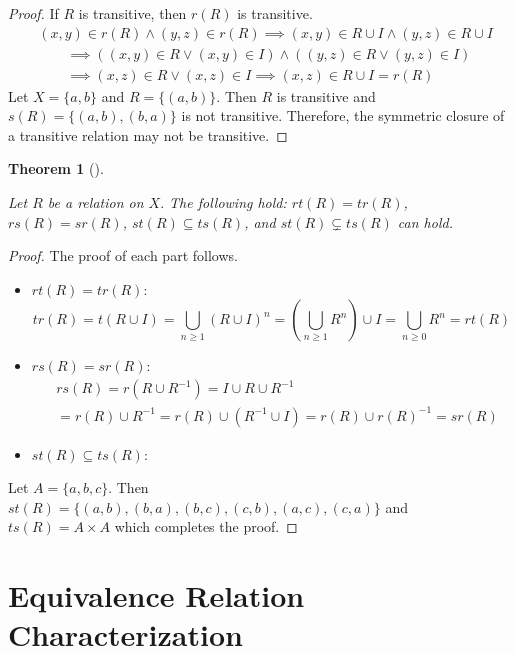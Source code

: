 \documentclass[
  letterpaper,
  10pt,
  reqno,
  twopage,
  openany]{book}
\theoremstyle{plain}
\theoremstyle{definition}
\theoremstyle{definition}
\theoremstyle{definition}
\theoremstyle{plain}
\theoremstyle{plain}
\newtheorem{theorem}{Theorem}[chapter]
\theoremstyle{remark}
\begin{document}
\begin{proof}

If \(R\) is transitive, then \(r(R)\) is transitive. \begin{align*}
& (x,y)\in r(R) \land (y,z)\in r(R)
\implies (x,y)\in R\cup I \land (y,z)\in R\cup I 
\\ & \qquad 
\implies ((x,y)\in R \lor (x,y)\in I)\land ((y,z)\in R \lor (y,z)\in I)
\\ & \qquad 
\implies (x,z)\in R \lor (x,z)\in I
\implies (x,z)\in R \cup I =r(R)
\end{align*} Let \(X=\{a,b\}\) and \(R=\{(a,b)\}.\) Then \(R\) is
transitive and \(s(R)=\{(a,b),(b,a)\}\) is not transitive. Therefore,
the symmetric closure of a transitive relation may not be transitive.

\end{proof}

\leavevmode{}%
\begin{theorem}[]\label{thm-rts}

Let \(R\) be a relation on \(X.\) The following hold: \(rt(R)=tr(R)\),
\(rs(R)=sr(R)\), \(st(R)\subseteq ts(R)\), and \(st(R)\subsetneq ts(R)\)
can hold.

\end{theorem}

\begin{proof}

The proof of each part follows.

\begin{itemize}
\item
  \(rt(R)=tr(R)\): \[ 
  tr(R)
  =t(R\cup I)=\bigcup_{n\geq 1} (R\cup I)^n
  =\left(\bigcup_{n\geq 1}R^n \right) \cup I 
  =\bigcup_{n\geq 0} R^n =rt(R)
  \]
\item
  \(rs(R)=sr(R)\): \begin{align*}
  & rs(R) = r(R\cup R^{-1}) = I\cup R\cup R^{-1} \\ 
  & =r(R)\cup R^{-1} =r(R)\cup (R^{-1}\cup I) =r(R)\cup r(R)^{-1} = sr(R)
  \end{align*}
\item
  \(st(R)\subseteq ts(R)\):
\end{itemize}

Let \(A=\{a,b,c\}.\) Then
\(st(R)=\{(a,b),(b,a),(b,c),(c,b),(a,c),(c,a)\}\) and
\(ts(R)=A\times A\) which completes the proof.

\end{proof}

\hypertarget{equivalence-relation-characterization}{%
\section{Equivalence Relation
Characterization}\label{equivalence-relation-characterization}}
\end{document}
